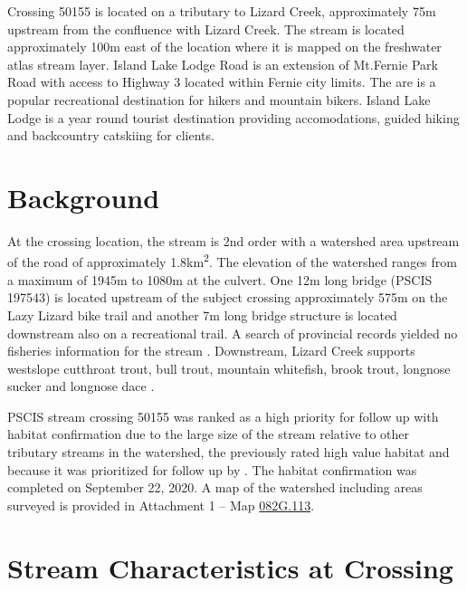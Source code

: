 \documentclass[
]{book}
\begin{document}
Crossing 50155 is located on a tributary to Lizard Creek, approximately 75m upstream from the confluence with Lizard Creek. The stream is located approximately 100m east of the location where it is mapped on the freshwater atlas stream layer. Island Lake Lodge Road is an extension of Mt.Fernie Park Road with access to Highway 3 located within Fernie city limits. The are is a popular recreational destination for hikers and mountain bikers. Island Lake Lodge is a year round tourist destination providing accomodations, guided hiking and backcountry catskiing for clients.

\hypertarget{background-1}{%
\section*{Background}\label{background-1}}

At the crossing location, the stream is 2nd order with a watershed area upstream of the road of approximately 1.8km\textsuperscript{2}. The elevation of the watershed ranges from a maximum of 1945m to 1080m at the culvert. One 12m long bridge (PSCIS 197543) is located upstream of the subject crossing approximately 575m on the Lazy Lizard bike trail and another 7m long bridge structure is located downstream also on a recreational trail. A search of provincial records yielded no fisheries information for the stream \citep{moeStreamInventorySample}. Downstream, Lizard Creek supports westslope cutthroat trout, bull trout, mountain whitefish, brook trout, longnose sucker and longnose dace \citep{data_fish_obs}.

PSCIS stream crossing 50155 was ranked as a high priority for follow up with habitat confirmation due to the large size of the stream relative to other tributary streams in the watershed, the previously rated high value habitat and because it was prioritized for follow up by \citet{vastFishPassage2013}. The habitat confirmation was completed on September 22, 2020. A map of the watershed including areas surveyed is provided in Attachment 1 -- Map \href{https://hillcrestgeo.ca/outgoing/fishpassage/projects/elk/FishPassage_082G.113.pdf}{082G.113}.

\hypertarget{stream-characteristics-at-crossing}{%
\section*{Stream Characteristics at Crossing}\label{stream-characteristics-at-crossing}}
\end{document}
